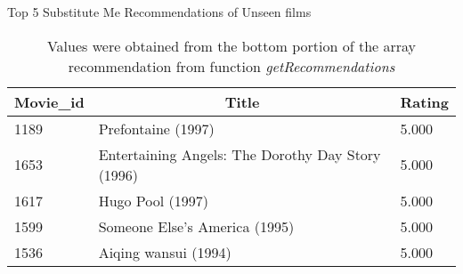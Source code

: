 \begin{table}[!htbp]
	\caption{Top 5 Substitute Me Recommendations of Unseen films} \label{tab:top-unseen}
	\begin{center}
	\vspace{-5mm}
		\begin{tabular}{ l l l }
			\hline
			\multicolumn{1}{c}{Movie\_id} & \multicolumn{1}{c}{Title} & \multicolumn{1}{c}{Rating}\\
			\hline
			1189   & Prefontaine (1997)                                &     5.000\\
			1653   & Entertaining Angels: The Dorothy Day Story (1996) &     5.000\\
			1617   & Hugo Pool (1997)                                  &     5.000\\
			1599   & Someone Else's America (1995)                     &     5.000\\
			1536   & Aiqing wansui (1994)                              &     5.000\\
			\hline
		\end{tabular}
	\caption*{\scriptsize Values were obtained from the bottom portion of the array recommendation from function \textit{getRecommendations}}
	 \end{center}
\end{table}